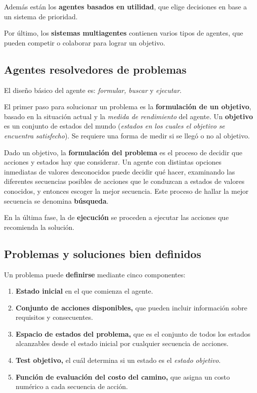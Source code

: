 \documentclass[10pt,a4paper]{article}
\begin{document}
Además están los \textbf{agentes basados en utilidad}, que elige decisiones en base a un sistema de prioridad.

Por último, los \textbf{sistemas multiagentes} contienen varios tipos de agentes, que pueden competir o colaborar para lograr un objetivo.

\subsection{Agentes resolvedores de problemas}

El diseño básico del agente es: \textit{formular, buscar} y \textit{ejecutar}.

El primer paso para solucionar un problema es la \textbf{formulación de un objetivo}, basado en la situación actual y la \textit{medida de rendimiento} del agente. Un \textbf{objetivo} es un conjunto de estados del mundo (\textit{estados en los cuales el objetivo se encuentra satisfecho}). Se requiere una forma de medir si se llegó o no al objetivo.

Dado un objetivo, la \textbf{formulación del problema} es el proceso de decidir que acciones y estados hay que considerar. Un agente con distintas opciones inmediatas de valores desconocidos puede decidir qué hacer, examinando las diferentes secuencias posibles de acciones que le conduzcan a estados de valores conocidos, y entonces escoger la mejor secuencia. Este proceso de hallar la mejor secuencia se denomina \textbf{búsqueda}.


En la última fase, la de \textbf{ejecución} se proceden a ejecutar las acciones que recomienda la solución.

\subsection{Problemas y soluciones bien definidos}

Un problema puede \textbf{definirse} mediante cinco componentes:
\begin{enumerate}
\item \textbf{Estado inicial} en el que comienza el agente.
\item \textbf{Conjunto de acciones disponibles,} que pueden incluir información sobre requisitos y consecuentes.
\item \textbf{Espacio de estados del problema,} que es el conjunto de todos los estados alcanzables desde el estado inicial por cualquier secuencia de acciones.
\item \textbf{Test objetivo,} el cuál determina si un estado es el \textit{estado objetivo}.
\item \textbf{Función de evaluación del costo del camino,} que asigna un costo numérico a cada secuencia de acción.
\end{enumerate}
\end{document}
